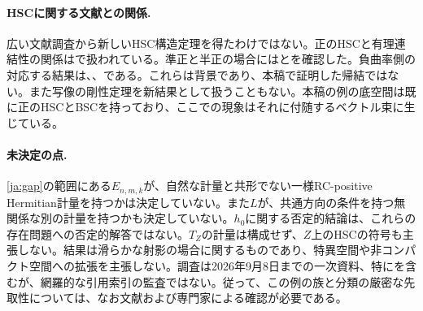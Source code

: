 \documentclass[12pt]{amsart}
\theoremstyle{definition}
\theoremstyle{remark}
\numberwithin{equation}{section}
\newcommand{\E}{E_{n,m,k}}
\newcommand{\jref}[1]{\eqref{ja:#1}}
\begin{document}
\paragraph{HSCに関する文献との関係.}
広い文献調査から新しいHSC構造定理を得たわけではない。正のHSCと有理連結性の関係は\cite[Theorem~1.7]{ja:Y18}で扱われている。準正と半正の場合には\cite[Theorems~1.4 and~1.5]{ja:ZZ}と\cite[Theorem~1.1, Remark~1.2]{ja:M25}を確認した。負曲率側の対応する結果は\cite[Theorem~2]{ja:WY}、\cite[Theorem~1.1, Corollary~1.2]{ja:TY}、\cite[Theorem~1.2]{ja:DT}である。これらは背景であり、本稿で証明した帰結ではない。また写像の剛性定理\cite[Theorem~1.1]{ja:Ymaps}を新結果として扱うこともない。本稿の例の底空間は既に正のHSCとBSCを持っており、ここでの現象はそれに付随するベクトル束に生じている。

\paragraph{未決定の点.}
\jref{gap}の範囲にある$\E$が、自然な計量と共形でない一様RC-positive Hermitian計量を持つかは決定していない。また$L$が、共通方向の条件を持つ無関係な別の計量を持つかも決定していない。$h_0$に関する否定的結論は、これらの存在問題への否定的解答ではない。$T_Z$の計量は構成せず、$Z$上のHSCの符号も主張しない。結果は滑らかな射影の場合に関するものであり、特異空間や非コンパクト空間への拡張を主張しない。調査は2026年9月8日までの一次資料、特に\cite{ja:Wu26}を含むが、網羅的な引用索引の監査ではない。従って、この例の族と分類の厳密な先取性については、なお文献および専門家による確認が必要である。
\end{document}
